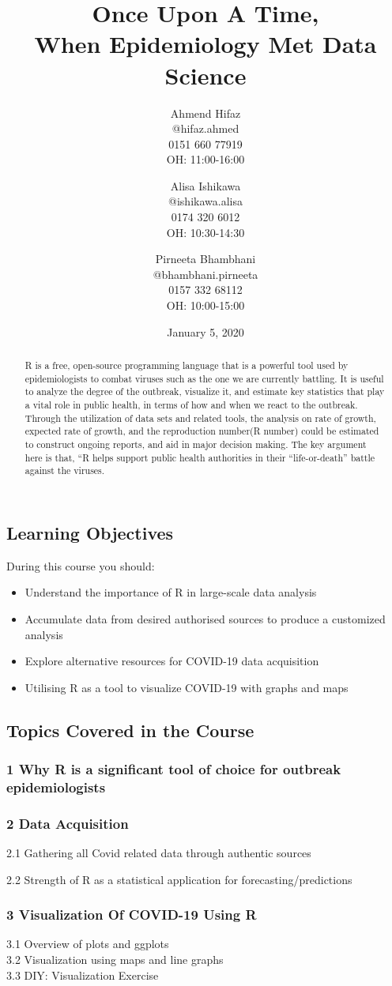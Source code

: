 \documentclass{article}
\title{Once Upon A Time, \\
When Epidemiology Met Data Science}
\author{Ahmend Hifaz  \\
	@hifaz.ahmed \\
	0151 660 77919 \\
	OH: 11:00-16:00 \\
	\and 
	Alisa Ishikawa \\
	@ishikawa.alisa \\
	0174 320 6012 \\
	OH: 10:30-14:30 \\
	\and 
	Pirneeta Bhambhani \\
	@bhambhani.pirneeta \\
	0157 332 68112 \\
	OH: 10:00-15:00 \\
}
\date{January 5, 2020}
\begin{document}
	\maketitle
	
\begin{abstract}
R is a free, open-source programming language that is a powerful tool used by epidemiologists to combat viruses such as the one we are currently battling. It is useful to analyze the degree of the outbreak, visualize it, and estimate key statistics that play a vital role in public health, in terms of how and when we react to the outbreak. Through the utilization of data sets and related tools, the analysis on rate of growth, expected rate of growth, and the reproduction number(R number) could be estimated to construct ongoing reports, and aid in major decision making. The key argument here is that, “R helps support public health authorities in their “life-or-death” battle against the viruses.
\end{abstract}
	
\subsection*{Learning Objectives}
	During this course you should:\label{book}
\begin{itemize}
	\item Understand the importance of R in large-scale data analysis
    \item Accumulate data from desired authorised sources to produce a customized analysis
    \item Explore alternative resources for COVID-19 data acquisition
    \item Utilising R as a tool to visualize COVID-19 with graphs and maps
\end{itemize}	
	
\subsection*{Topics Covered in the Course}

\subsubsection*{1 Why R is a significant tool of choice for outbreak epidemiologists}

\subsubsection*{2 Data Acquisition}
    2.1 Gathering all Covid related data through authentic sources \\
\begin{spacing}{1.5}
    2.2 Strength of R as a statistical application for forecasting/predictions
    \subsubsection*{3 Visualization Of COVID-19 Using R}
    3.1 Overview of plots and ggplots \\
    3.2 Visualization using maps and line graphs \\
    3.3 DIY: Visualization Exercise
\end{spacing}
\noindent 
\end{document}
